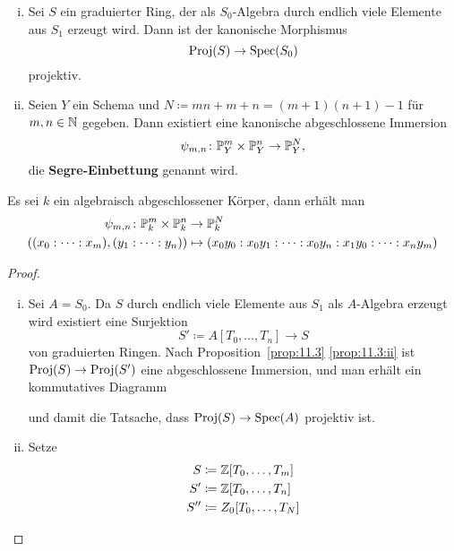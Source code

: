 \begin{kor}
	\label{kor:11.4}
	\begin{enumerate}[i)]
		\item\label{kor:11.4:i} Sei $S$ ein graduierter Ring, der als $S_0$-Algebra durch endlich viele Elemente aus $S_1$ erzeugt wird. Dann ist der kanonische Morphismus
			\[
				\Proj(S) \to \Spec(S_0)
			\]
			projektiv.
		\item\label{kor:11.4:ii} Seien $Y$ ein Schema und $N \coloneqq mn + m + n = (m+1)(n+1)-1$ für $m,n \in \N$ gegeben. Dann existiert eine kanonische abgeschlossene Immersion
			\[
				\psi_{m,n} \colon \P_Y^m \times \P_Y^n \to \P_Y^N,
			\]
			die \textbf{Segre-Einbettung} genannt wird.
	\end{enumerate}
	\begin{bsp*} Es sei $k$ ein algebraisch abgeschlossener Körper, dann erhält man
		\begin{align*}
			\psi_{m,n} \colon \P_k^m \times \P_k^n &\to \P_k^N \\
			((x_0 : \dotsm : x_m),(y_1:\dotsm:y_n)) &\mapsto (x_0 y_0 : x_0 y_1 : \dotsm : x_0 y_n: x_1 y_0 : \dotsm : x_n y_m)
		\end{align*}    
	\end{bsp*}
	\begin{proof}
		\begin{enumerate}[i)]
		\item Sei $A =S_0$. Da $S$ durch endlich viele Elemente aus $S_1$ als $A$-Algebra erzeugt wird existiert eine Surjektion
			\[
				S' \coloneqq A[T_0,\dotsc,T_n] \to S
			\]
			von graduierten Ringen. Nach Proposition~\ref{prop:11.3} \ref{prop:11.3:ii} ist $\Proj(S) \to \Proj(S')$ eine abgeschlossene Immersion, und man erhält ein kommutatives Diagramm
			\begin{center}
			\end{center}
			und damit die Tatsache, dass $\Proj(S) \to \Spec(A)$ projektiv ist.
		\item
			Setze 
			\begin{align*}
				S &\coloneqq \Z[T_0,\dotsc,T_m]\\
				S' &\coloneqq \Z[T_0,\dotsc, T_n]\\
				S'' &\coloneqq Z_0 [ T_0,\dotsc,T_N ]\\

\end{align*}
\end{enumerate}
\end{proof}
\end{kor}
